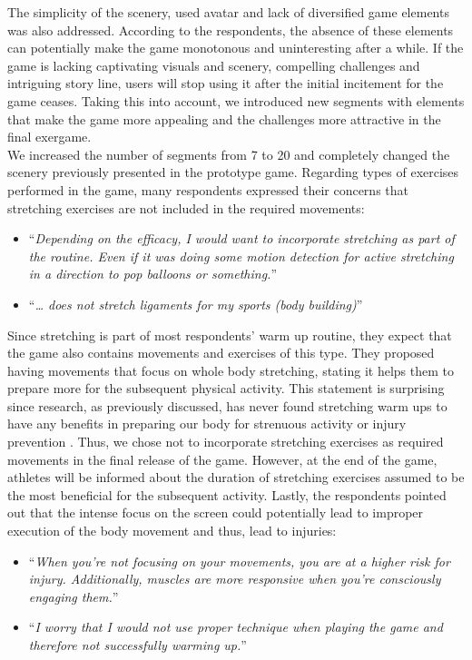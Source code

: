 The simplicity of the scenery, used avatar and lack of diversified game elements was also addressed. According to the respondents, the absence of these elements can potentially make the game monotonous and uninteresting after a while. If the game is lacking captivating visuals and scenery, compelling challenges and intriguing story line, users will stop using it after the initial incitement for the game ceases. Taking this into account, we introduced new segments with elements that make the game more appealing and the challenges more attractive in the final exergame. \\We increased the number of segments from 7 to 20 and completely changed the scenery previously presented in the prototype game. Regarding types of exercises performed in the game, many respondents expressed their concerns that stretching exercises are not included in the required movements: 
\begin{itemize}
\item ``\textit{Depending on the efficacy, I would want to incorporate stretching as part of the routine. Even if it was doing some motion detection for active stretching in a direction to pop balloons or something.}''
\item ``\textit{… does not stretch ligaments for my sports (body building)}''
\end{itemize}
Since stretching is part of most respondents' warm up routine, they expect that the game also contains movements and exercises of this type. They proposed having movements that focus on whole body stretching, stating it helps them to prepare more for the subsequent physical activity. This statement is surprising since research, as previously discussed,  has never found stretching warm ups to have any benefits in preparing our body for strenuous activity or injury prevention \cite{pereles2012large}. Thus, we chose not to incorporate stretching exercises as required movements in the final release of the game. However, at the end of the game, athletes will be informed about the duration of stretching exercises assumed to be the most beneficial for the subsequent activity. Lastly, the respondents pointed out that the intense focus on the screen could potentially lead to improper execution of the body movement and thus, lead to injuries:
\begin{itemize}
\item ``\textit{When you're not focusing on your movements, you are at a higher risk for injury. Additionally, muscles are more responsive when you're consciously engaging them.}''
\item ``\textit{I worry that I would not use proper technique when playing the game and therefore not successfully warming up.}''
\end{itemize}
